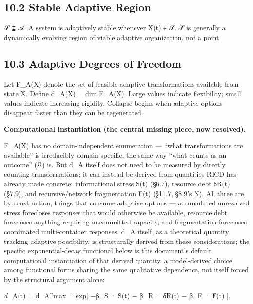 \documentclass[
]{article}
\begin{document}
\hypertarget{stable-adaptive-region}{%
\subsection{10.2 Stable Adaptive Region}\label{stable-adaptive-region}}

𝒮 ⊆ 𝒜. A system is adaptively stable whenever X(t) ∈ 𝒮. 𝒮 is generally a
dynamically evolving region of viable adaptive organization, not a
point.

\hypertarget{adaptive-degrees-of-freedom}{%
\subsection{10.3 Adaptive Degrees of
Freedom}\label{adaptive-degrees-of-freedom}}

Let F\_A(X) denote the set of feasible adaptive transformations
available from state X. Define d\_A(X) = dim F\_A(X). Large values
indicate flexibility; small values indicate increasing rigidity.
Collapse begins when adaptive options disappear faster than they can be
regenerated.

\textbf{Computational instantiation (the central missing piece, now
resolved).}

F\_A(X) has no domain-independent enumeration --- ``what transformations
are available'' is irreducibly domain-specific, the same way ``what
counts as an outcome'' (Ω) is. But d\_A itself does not need to be
measured by directly counting transformations; it can instead be derived
from quantities RICD has already made concrete: informational stress
S(t) (§6.7), resource debt δR(t) (§7.9), and recursive/network
fragmentation F(t) (§11.7, §8.9's N). All three are, by construction,
things that consume adaptive options --- accumulated unresolved stress
forecloses responses that would otherwise be available, resource debt
forecloses anything requiring uncommitted capacity, and fragmentation
forecloses coordinated multi-container responses. d\_A itself, as a
theoretical quantity tracking adaptive possibility, is structurally
derived from these considerations; the specific exponential-decay
functional below is this document's default computational instantiation
of that derived quantity, a model-derived choice among functional forms
sharing the same qualitative dependence, not itself forced by the
structural argument alone:

\emph{d}\_A(t) = d\_A\^{}max · exp{[} −β\_S · S̃(t) − β\_R · δR̃(t) − β\_F
· F̃(t) {]},
\end{document}
